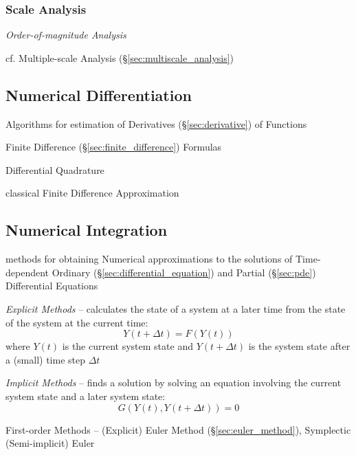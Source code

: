\subsubsection{Scale Analysis}\label{sec:scale_analysis}

\emph{Order-of-magnitude Analysis}

cf. Multiple-scale Analysis (\S\ref{sec:multiscale_analysis})



\subsection{Numerical Differentiation}\label{sec:numerical_differentiation}

Algorithms for estimation of Derivatives (\S\ref{sec:derivative}) of Functions

Finite Difference (\S\ref{sec:finite_difference}) Formulas

Differential Quadrature

classical Finite Difference Approximation



\subsection{Numerical Integration}\label{sec:numerical_integration}

methods for obtaining Numerical approximations to the solutions of
Time-dependent Ordinary (\S\ref{sec:differential_equation}) and Partial
(\S\ref{sec:pde}) Differential Equations

\emph{Explicit Methods} -- calculates the state of a system at a later time
from the state of the system at the current time:
\[
  Y(t+\Delta{t}) = F(Y(t))
\]
where $Y(t)$ is the current system state and $Y(t + \Delta{t})$ is the system
state after a (small) time step $\Delta{t}$

\emph{Implicit Methods} -- finds a solution by solving an equation involving
the current system state and a later system state:
\[
  G(Y(t), Y(t + \Delta{t})) = 0
\]

First-order Methods -- (Explicit) Euler Method (\S\ref{sec:euler_method}),
Symplectic (Semi-implicit) Euler

